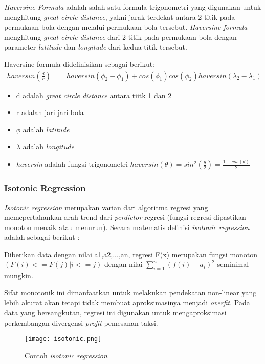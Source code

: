 \documentclass{article}
\begin{document}
\begin{adjustwidth}{4em}{0pt}
	
\hspace{\parindent}\textit{Haversine Formula} adalah salah satu formula trigonometri yang digunakan untuk menghitung \textit{great circle distance}, yakni jarak terdekat antara 2 titik pada permukaan bola dengan melalui permukaan bola tersebut. \textit{Haversine formula} menghitung \textit{great circle distance} dari 2 titik pada permukaan bola dengan parameter \textit{latitude} dan \textit{longitude} dari kedua titik tersebut.

Haversine formula didefinisikan sebagai berikut:
\begin{align*}
haversin(\frac{d}{r}) &= haversin(\phi _{2} - \phi _{1}) + cos(\phi _{1})cos(\phi _{2})haversin(\lambda _{2} - \lambda _{1})
\end{align*}
\begin{itemize}
	\setlength{\itemindent}{1cm}
	\item{d adalah \textit{great circle distance} antara tiitk 1 dan 2}
	\item{r adalah jari-jari bola}
	\item{$\phi$ adalah \textit{latitude}}
	\item{$\lambda$ adalah \textit{longitude}}
	\item{\textit{haversin} adalah fungsi trigonometri $haversin(\theta) = sin^2(\frac{\theta}{2}) = \frac{1-cos(\theta)}{2}$}
\end{itemize}

\end{adjustwidth}

\subsubsection{Isotonic Regression}
\begin{adjustwidth}{4em}{0pt}
	
\hspace{\parindent}\textit{Isotonic regression} merupakan varian dari algoritma regresi yang memepertahankan arah trend dari \textit{perdictor} regresi (fungsi regresi dipastikan monoton menaik atau menurun). Secara matematis definisi \textit{isotonic regression} adalah sebagai berikut :

Diberikan data dengan nilai a1,a2,...,an, regresi F(x) merupakan fungsi monoton $(F(i) <= F(j) | i <= j)$  dengan nilai $\sum\limits_{i=1}^n({f(i)-a_{i}})^2$ seminimal mungkin.

Sifat monotonik ini dimanfaatkan untuk melakukan pendekatan  non-linear yang lebih akurat akan tetapi tidak membuat aproksimasinya menjadi \textit{overfit}. Pada data yang bersangkutan, regresi ini digunakan untuk mengaproksimasi perkembangan divergensi \textit{profit} pemesanan taksi.

\begin{figure}[H]
	\texttt{[image: isotonic.png]}
	\caption{Contoh \textit{isotonic regression}}
\end{figure}

\end{adjustwidth}
\end{document}
